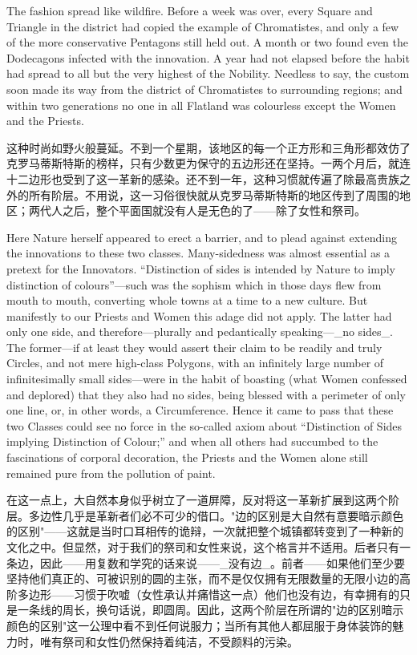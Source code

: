 \documentclass[12pt,UTF8]{ctexbook}
\begin{document}
The fashion spread like wildfire. Before a week was over, every Square and Triangle in the district had copied the example of Chromatistes, and only a few of the more conservative Pentagons still held out. A month or two found even the Dodecagons infected with the innovation. A year had not elapsed before the habit had spread to all but the very highest of the Nobility. Needless to say, the custom soon made its way from the district of Chromatistes to surrounding regions; and within two generations no one in all Flatland was colourless except the Women and the Priests.

这种时尚如野火般蔓延。不到一个星期，该地区的每一个正方形和三角形都效仿了克罗马蒂斯特斯的榜样，只有少数更为保守的五边形还在坚持。一两个月后，就连十二边形也受到了这一革新的感染。还不到一年，这种习惯就传遍了除最高贵族之外的所有阶层。不用说，这一习俗很快就从克罗马蒂斯特斯的地区传到了周围的地区；两代人之后，整个平面国就没有人是无色的了——除了女性和祭司。

Here Nature herself appeared to erect a barrier, and to plead against extending the innovations to these two classes. Many-sidedness was almost essential as a pretext for the Innovators. ``Distinction of sides is intended by Nature to imply distinction of colours''---such was the sophism which in those days flew from mouth to mouth, converting whole towns at a time to a new culture. But manifestly to our Priests and Women this adage did not apply. The latter had only one side, and therefore---plurally and pedantically speaking---\_no sides\_. The former---if at least they would assert their claim to be readily and truly Circles, and not mere high-class Polygons, with an infinitely large number of infinitesimally small sides---were in the habit of boasting (what Women confessed and deplored) that they also had no sides, being blessed with a perimeter of only one line, or, in other words, a Circumference. Hence it came to pass that these two Classes could see no force in the so-called axiom about ``Distinction of Sides implying Distinction of Colour;'' and when all others had succumbed to the fascinations of corporal decoration, the Priests and the Women alone still remained pure from the pollution of paint.

在这一点上，大自然本身似乎树立了一道屏障，反对将这一革新扩展到这两个阶层。多边性几乎是革新者们必不可少的借口。"边的区别是大自然有意要暗示颜色的区别"——这就是当时口耳相传的诡辩，一次就把整个城镇都转变到了一种新的文化之中。但显然，对于我们的祭司和女性来说，这个格言并不适用。后者只有一条边，因此——用复数和学究的话来说——\_没有边\_。前者——如果他们至少要坚持他们真正的、可被识别的圆的主张，而不是仅仅拥有无限数量的无限小边的高阶多边形——习惯于吹嘘（女性承认并痛惜这一点）他们也没有边，有幸拥有的只是一条线的周长，换句话说，即圆周。因此，这两个阶层在所谓的"边的区别暗示颜色的区别"这一公理中看不到任何说服力；当所有其他人都屈服于身体装饰的魅力时，唯有祭司和女性仍然保持着纯洁，不受颜料的污染。
\end{document}
